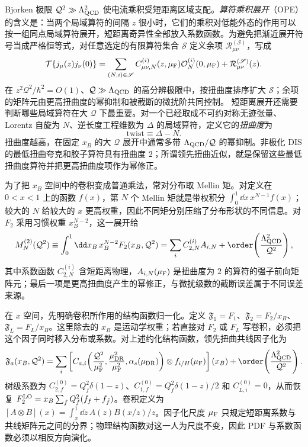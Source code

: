 Bjorken 极限 $\mathcal Q^2\gg\Lambda_{\rm QCD}^2$ 使电流乘积受短距离区域支配。\emph{算符乘积展开}（OPE）的含义是：当两个局域算符的间隔 $z$ 很小时，它们的乘积对低能外态的作用可以按一组同点局域算符展开，短距离奇异性全部放入系数函数。为避免把渐近展开符号当成严格恒等式，对任意选定的有限算符集合 $\mathscr S$ 定义余项 $\mathcal R_{\mu\nu}^{(\mathscr S)}$，写成
\begin{equation}
 {
 \mathcal T\{j_\mu(z)j_\nu(0)\}
 =\sum_{(N,i)\in\mathscr S}C_{\mu\nu,N}^{(i)}(z,\mu_{\rm F})
 \mathcal O_N^{(i)}(0,\mu_{\rm F})
 +\mathcal R_{\mu\nu}^{(\mathscr S)}(z).}
 \label{eq:dis-current-product-ope-dp68}
\end{equation}
在 $z^2\mathcal Q^2/\hbar^2=O(1)$、$\mathcal Q\gg\Lambda_{\rm QCD}$ 的高分辨极限中，按扭曲度排序扩大 $\mathscr S$；余项的矩阵元由更高扭曲度的幂抑制和被截断的微扰阶共同控制。
短距离展开还需要判断哪些局域算符在大 $\mathcal Q$ 下最重要。对一个已经取成不可约对称无迹张量、Lorentz 自旋为 $N$、逆长度工程维数为 $\Delta$ 的局域算符，定义它的\emph{扭曲度}为
\begin{equation*}
 \text{twist}\equiv\Delta-N.
\end{equation*}
扭曲度越高，在固定 $x_B$ 的大 $\mathcal Q$ 展开中通常多带 $\Lambda_{\rm QCD}/\mathcal Q$ 的幂抑制。非极化 DIS 的最低扭曲夸克和胶子算符具有扭曲度 $2$；所谓领先扭曲近似，就是保留这些最低扭曲度算符并把更高扭曲度项作为幂修正。

为了把 $x_B$ 空间中的卷积变成普通乘法，常对分布取 Mellin 矩。对定义在 $0<x<1$ 上的函数 $f(x)$，第 $N$ 个 Mellin 矩就是带权积分 $\int_0^1\dd x\,x^{N-1}f(x)$；较大的 $N$ 给较大的 $x$ 更高权重，因此不同矩分别压缩了分布形状的不同信息。对 $F_2$ 采用习惯权重 $x_B^{N-2}$，这一展开给
\begin{equation}
 {
 M_N^{(2)}(\mathcal Q^2)
 \equiv\int_0^1\dd x_B\,x_B^{N-2}F_2(x_B,\mathcal Q^2)
 =\sum_i C_{2,N}^{(i)} A_{i,N}
 +\order\!\left(\frac{\Lambda_{\rm QCD}^2}{\mathcal Q^2}\right),}
 \label{eq:dis-ope-moment-factorization-dp13}
\end{equation}
其中系数函数 $C_{2,N}^{(i)}$ 含短距离物理，$A_{i,N}(\mu_{\rm F})$ 是扭曲度为 $2$ 的算符的强子前向矩阵元；最后一项是更高扭曲度产生的幂修正，与微扰级数的截断误差属于不同误差来源。

在 $x$ 空间，先明确卷积所作用的结构函数归一化。定义 $\mathfrak F_1=F_1$、$\mathfrak F_2=F_2/x_B$、$\mathfrak F_L=F_L/x_B$。这里除去的 $x_B$ 是运动学权重；若直接对 $F_2$ 或 $F_L$ 写卷积，必须把这个因子同时移入分布或系数。对上述约化结构函数，领先扭曲共线因子化为
\begin{equation}
 {
 \mathfrak F_a(x_B,\mathcal Q^2)
 =\sum_i\left[
 C_{a,i}\!\left(
 \frac{\mathcal Q^2}{\mu_{\rm F}^2},
 \frac{\mu_{\rm DR}^2}{\mu_{\rm F}^2},
 \alpha_s(\mu_{\rm DR})\right)
 \otimes f_{i/H}(\mu_{\rm F})\right](x_B)
 +\order\!\left(\frac{\Lambda_{\rm QCD}^2}{\mathcal Q^2}\right).}
 \label{eq:dis-collinear-factorization-dp14}
\end{equation}
树级系数为 $C_{2,f}^{(0)}=Q_f^2\delta(1-z)$、$C_{1,f}^{(0)}=Q_f^2\delta(1-z)/2$ 和 $C_{L,i}^{(0)}=0$，从而恢复 $F_2^{\rm LO}=x_B\sum_fQ_f^2(f_f+f_{\bar f})$。卷积定义为 $[A\otimes B](x)=\int_x^1\dd z\,A(z)B(x/z)/z$。因子化尺度 $\mu_{\rm F}$ 只规定短距离系数与共线矩阵元之间的分界；物理结构函数对这一人为尺度不变，因此 PDF 与系数函数必须以相反方向演化。

